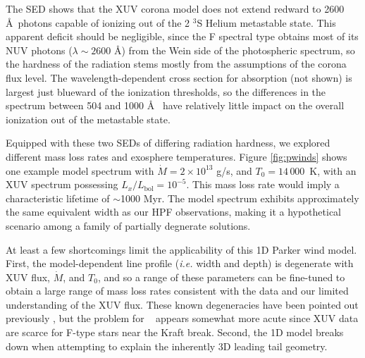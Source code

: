 \documentclass[twocolumn]{aastex631}
\newcommand{\hatpb}{\object{HAT-P-67 b}}
\begin{document}
The SED shows that the XUV corona model does not extend redward to 2600 \AA~photons capable of ionizing out of the 2 $^3$S Helium metastable state.  This apparent deficit should be negligible, since the F spectral type obtains most of its NUV photons ($\lambda\sim2600$ \AA) from the Wein side of the photospheric spectrum, so the hardness of the radiation stems mostly from the assumptions of the corona flux level.  The wavelength-dependent cross section for absorption (not shown) is largest just blueward of the ionization thresholds, so the differences in the spectrum between 504 and 1000 \AA~ have relatively little impact on the overall ionization out of the metastable state.

Equipped with these two SEDs of differing radiation hardness, we explored different mass loss rates and exosphere temperatures.  Figure \ref{fig:pwinds} shows one example model spectrum with $\dot{M} = 2\times 10^{13}$ g/s, and $T_0=14\,000$~K, with an XUV spectrum possessing $L_x/L_\mathrm{bol}=10^{-5}$.  This mass loss rate would imply a characteristic lifetime of $\sim$1000 Myr.  The model spectrum exhibits approximately the same equivalent width as our HPF observations, making it a hypothetical scenario among a family of partially degnerate solutions.

At least a few shortcomings limit the applicability of this 1D Parker wind model.  First, the model-dependent line profile (\emph{i.e.} width and depth) is degenerate with XUV flux, $\dot{M}$, and $T_0$, and so a range of these parameters can be fine-tuned to obtain a large range of mass loss rates consistent with the data and our limited understanding of the XUV flux.  These known degeneracies have been pointed out previously \citep{2022AJ....164..234V,2019ApJ...881..133O}, but the problem for \hatpb~ appears somewhat more acute since XUV data are scarce for F-type stars near the Kraft break.  Second, the 1D model breaks down when attempting to explain the inherently 3D leading tail geometry.
\end{document}
